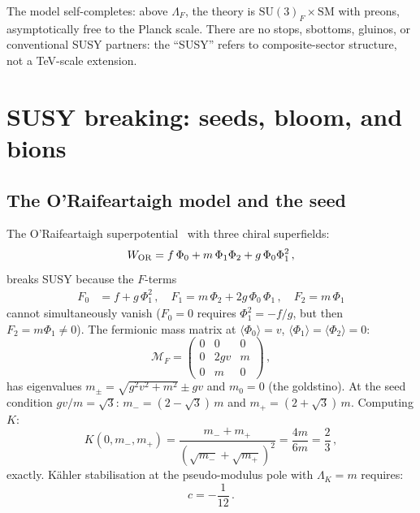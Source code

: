 \documentclass[12pt,a4paper]{article}
\newcommand{\SU}{\mathrm{SU}}
\begin{document}
The model self-completes: above $\Lambda_F$, the theory is
$\SU(3)_F \times \text{SM}$ with preons, asymptotically free
to the Planck scale.
There are no stops, sbottoms, gluinos, or conventional SUSY
partners: the ``SUSY'' refers to composite-sector structure,
not a TeV-scale extension.


\section{SUSY breaking: seeds, bloom, and bions}
\label{sec:susy_breaking}

\subsection{The O'Raifeartaigh model and the seed}

The O'Raifeartaigh superpotential~\cite{ORaifeartaigh:1975}
with three chiral superfields:
\begin{equation}
  W_{\rm OR} = f\,\Phi_0 + m\,\Phi_1\Phi_2
  + g\,\Phi_0\Phi_1^2\,,
  \label{eq:W_OR}
\end{equation}
breaks SUSY because the $F$-terms
\begin{align}
  F_0 &= f + g\,\Phi_1^2\,,\quad
  F_1 = m\,\Phi_2 + 2g\,\Phi_0\,\Phi_1\,,\quad
  F_2 = m\,\Phi_1
\end{align}
cannot simultaneously vanish ($F_0 = 0$ requires
$\Phi_1^2 = -f/g$, but then $F_2 = m\Phi_1 \neq 0$).
The fermionic mass matrix at
$\langle\Phi_0\rangle = v$,
$\langle\Phi_1\rangle = \langle\Phi_2\rangle = 0$:
\begin{equation}
  \mathcal{M}_F = \begin{pmatrix}
    0 & 0 & 0 \\ 0 & 2gv & m \\ 0 & m & 0
  \end{pmatrix}\,,
  \label{eq:fermion_mass_matrix}
\end{equation}
has eigenvalues $m_\pm = \sqrt{g^2v^2 + m^2} \pm gv$ and
$m_0 = 0$ (the goldstino).
At the seed condition $gv/m = \sqrt{3}$:
$m_- = (2-\sqrt{3})\,m$ and $m_+ = (2+\sqrt{3})\,m$.
Computing $K$:
\begin{equation}
  K(0, m_-, m_+) = \frac{m_- + m_+}{(\sqrt{m_-}+\sqrt{m_+})^2}
  = \frac{4m}{6m} = \frac{2}{3}\,,
\end{equation}
exactly.
K\"ahler stabilisation at the pseudo-modulus pole with
$\Lambda_K = m$ requires:
\begin{equation}
  c = -\frac{1}{12}\,.
  \label{eq:c_12}
\end{equation}
\end{document}
